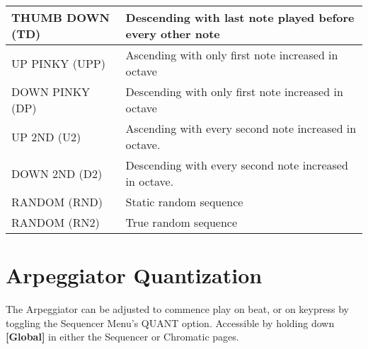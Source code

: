 \begin{tabular}{|l|l|}
THUMB DOWN (TD)                & Descending with last note played before every other note                                                                                                                         \\ \hline
UP PINKY  (UPP)                & Ascending with only first note increased in octave                                                                                                                                                                 \\ \hline
DOWN PINKY (DP)                & Descending with only first note increased in octave                                                                                           
                                       \\ \hline
UP 2ND (U2)                & Ascending with every second note increased in octave.                                                                                             
                                       \\ \hline
DOWN 2ND (D2)                & Descending with every second note increased in octave. 
                                       \\ \hline
RANDOM (RND)                & Static random sequence                                                                                                                   
                                       \\ \hline
RANDOM (RN2)                & True random sequence                                                                                                                   
                                       \\ \hline
\end{tabular}

\section{Arpeggiator Quantization}
The Arpeggiator can be adjusted to commence play on beat, or on keypress by toggling the Sequencer Menu's QUANT option. Accessible by holding down \textbf{[Global]} in either the Sequencer or Chromatic pages.
